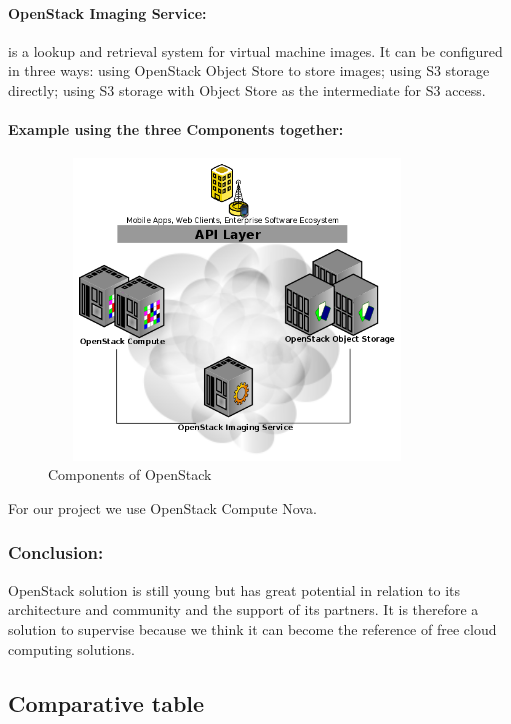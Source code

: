 \paragraph{OpenStack Imaging Service:}is a lookup and retrieval system for virtual machine images. It can be configured in three ways: 
using OpenStack Object Store to store images; using S3 storage directly; using S3 storage with Object Store as the intermediate for S3 access.

\paragraph{Example using the three Components together: }

\begin{figure}[!h]
 \center
\includegraphics[width=10cm, height=8cm]{./images/OpenStackCore.png}
 \caption{Components of OpenStack}
\end{figure}





For our project we use OpenStack Compute Nova.


\subsubsection{Conclusion:}
OpenStack solution is still young but has great potential in relation to its architecture and community and the support of its partners.
 It is therefore a solution to supervise because we think it can become the reference of free cloud computing solutions.


\newpage
\subsection{Comparative table}


